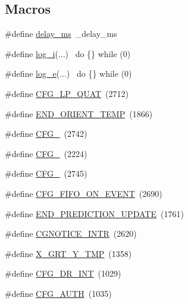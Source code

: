 \subsection*{Macros}
\begin{DoxyCompactItemize}
\item 
\#define \hyperlink{group___d_r_i_v_e_r_s_gae36aca5baf9b6b7d74992aef00686d67}{delay\+\_\+ms}~\+\_\+delay\+\_\+ms
\item 
\#define \hyperlink{group___d_r_i_v_e_r_s_ga67fc07fa528d8e62dc7b88a847b563f5}{log\+\_\+i}(...)      ~do \{\} while (0)
\item 
\#define \hyperlink{group___d_r_i_v_e_r_s_gac9308c888b394d1b403d9ba6e1f13fd2}{log\+\_\+e}(...)      ~do \{\} while (0)
\item 
\#define \hyperlink{group___d_r_i_v_e_r_s_gadf5652e51b8c08c2eb6a902d1d1f319c}{C\+F\+G\+\_\+\+L\+P\+\_\+\+Q\+U\+AT}~(2712)
\item 
\#define \hyperlink{group___d_r_i_v_e_r_s_ga5c2c9516862587e8e1aa8c0c428076d9}{E\+N\+D\+\_\+\+O\+R\+I\+E\+N\+T\+\_\+\+T\+E\+MP}~(1866)
\item 
\#define \hyperlink{group___d_r_i_v_e_r_s_gaae53afa64170cb4723c04f16c2fa5f30}{C\+F\+G\+\_}~(2742)
\item 
\#define \hyperlink{group___d_r_i_v_e_r_s_ga12aa4c3bdc65c24ca29ef08e62fd3e13}{C\+F\+G\+\_}~(2224)
\item 
\#define \hyperlink{group___d_r_i_v_e_r_s_ga18ca772a0ce432c5ccb0e318af3c2b86}{C\+F\+G\+\_}~(2745)
\item 
\#define \hyperlink{group___d_r_i_v_e_r_s_ga7aa6ed56d6fd41be120b9bdb488c220a}{C\+F\+G\+\_\+\+F\+I\+F\+O\+\_\+\+O\+N\+\_\+\+E\+V\+E\+NT}~(2690)
\item 
\#define \hyperlink{group___d_r_i_v_e_r_s_ga89e5662bddc67ac00f5b85035bd60ed8}{E\+N\+D\+\_\+\+P\+R\+E\+D\+I\+C\+T\+I\+O\+N\+\_\+\+U\+P\+D\+A\+TE}~(1761)
\item 
\#define \hyperlink{group___d_r_i_v_e_r_s_gafd43f64b7c6bc86374cedfcf69c6b12f}{C\+G\+N\+O\+T\+I\+C\+E\+\_\+\+I\+N\+TR}~(2620)
\item 
\#define \hyperlink{group___d_r_i_v_e_r_s_ga0ff907b44d0e42641e71e6da41829090}{X\+\_\+\+G\+R\+T\+\_\+\+Y\+\_\+\+T\+MP}~(1358)
\item 
\#define \hyperlink{group___d_r_i_v_e_r_s_gaca5a7c1f2519e622571bda2aa2311553}{C\+F\+G\+\_\+\+D\+R\+\_\+\+I\+NT}~(1029)
\item 
\#define \hyperlink{group___d_r_i_v_e_r_s_ga93cd3f526d9e31b00c9364bab3df41e0}{C\+F\+G\+\_\+\+A\+U\+TH}~(1035)
\item 

\end{DoxyCompactItemize}
